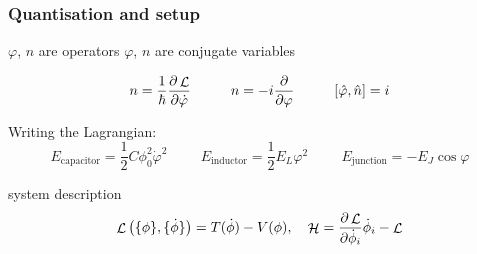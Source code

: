 \documentclass[10pt]{beamer}
\DeclareMathOperator{\lagr}{\mathcal{L}}
\DeclareMathOperator{\ham}{\mathcal{H}}
\begin{document}


\begin{frame}[shrink=10]
\frametitle{Quantisation and setup}
\vspace{3ex}

$\varphi$, $n$ are operators
$\varphi$, $n$ are conjugate variables

\begin{equation}
n = \frac{1}{\hbar} \pdv{\lagr}{\dot{\varphi}}
\hspace{1cm}
n = -i\pdv{}{\varphi}
\hspace{1cm}
\comm{\hat{\varphi}}{\hat{n}} = i
\end{equation}

Writing the Lagrangian:
\begin{equation}
E_\text{capacitor} = \frac{1}{2} C \phi_0^2 \dot{\varphi}^2
\hspace{1cm}
E_\text{inductor} = \frac{1}{2} E_L \varphi^2
\hspace{1cm}
E_\text{junction} = - E_J \cos{\varphi}
\end{equation}

system description
\begin{equation}
\lagr\left(\{\phi\}, \{\dot{\phi}\}\right) = T(\dot{\phi}) - V(\phi),
\quad
\ham = \pdv{\lagr}{\dot{\phi}_i} \dot{\phi}_i - \lagr
\end{equation}


\end{frame}

\end{document}

